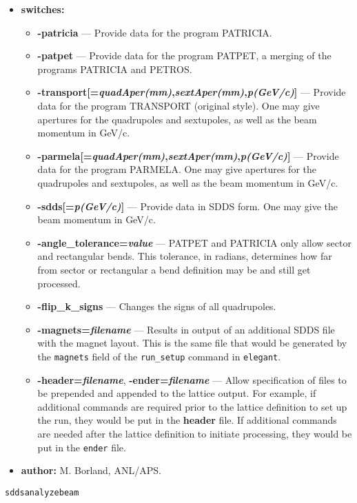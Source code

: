 \documentclass[11pt]{article}
\begin{document}
\begin{itemize}
\item {\bf switches:}
\begin{itemize}
\item {\bf -patricia} --- Provide data for the program PATRICIA.
\item {\bf -patpet} --- Provide data for the program PATPET, a merging of the programs
        PATRICIA and PETROS.
\item {\bf -transport[={\em quadAper(mm)},{\em sextAper(mm)},{\em p(GeV/c)}]} --- 
        Provide data for the program TRANSPORT (original style). 
	One may give apertures for
        the quadrupoles and sextupoles, as well as the beam momentum in GeV/c.
\item {\bf -parmela[={\em quadAper(mm)},{\em sextAper(mm)},{\em p(GeV/c)}]} --- 
        Provide data for the program PARMELA. One may give apertures for
        the quadrupoles and sextupoles, as well as the beam momentum in GeV/c.
\item {\bf -sdds[={\em p(GeV/c)}]} --- Provide data in SDDS form.  One may give the beam momentum in GeV/c.
\item {\bf -angle\_tolerance={\em value}}  --- PATPET and PATRICIA only allow sector and rectangular bends.
        This tolerance, in radians, determines how far from sector or rectangular a bend 
        definition may be and still get processed.
\item {\bf -flip\_k\_signs} --- Changes the signs of all quadrupoles.
\item {\bf -magnets={\em filename}} --- Results in output of an additional SDDS file with the magnet layout.
        This is the same file that would be generated by the {\tt magnets} field of the 
        {\tt run\_setup} command in {\tt elegant}.
\item {\bf -header={\em filename}}, {\bf -ender={\em filename}} --- 
        Allow specification of files to be prepended and appended to
        the lattice output.  For example, if additional commands are required prior to the
        lattice definition to set up the run, they would be put in the {\bf header} file.
        If additional commands are needed after the lattice definition to initiate processing, they 
        would be put in the {\tt ender} file.
\end{itemize}

\item {\bf author:} M. Borland, ANL/APS.
\end{itemize}

\begin{latexonly}
\newpage
\begin{center}{\Large\verb|sddsanalyzebeam|}\end{center}
\end{latexonly}
\end{document}
